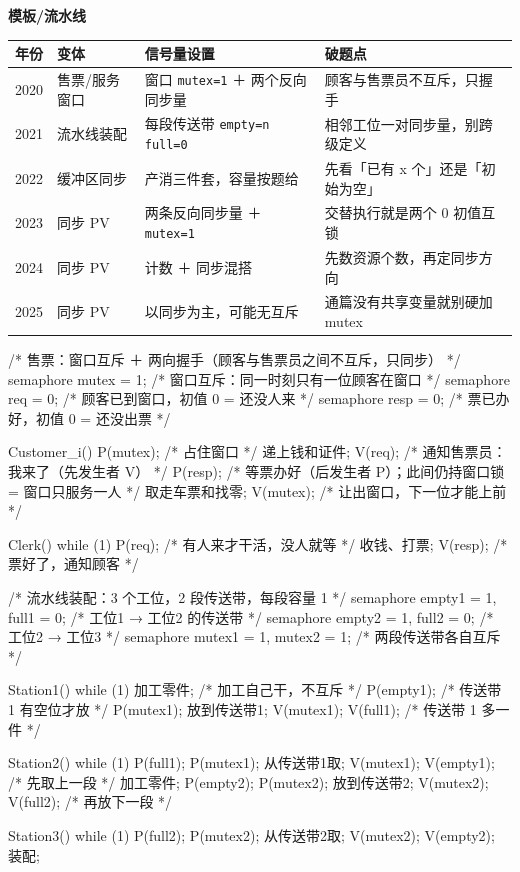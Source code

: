 \documentclass[10pt,a4paper]{ctexart}
\begin{document}
\textbf{模板/流水线}

\begin{center}\small
\begin{tabularx}{\linewidth}{@{}cl>{\raggedright\arraybackslash}X>{\raggedright\arraybackslash}X@{}}
\toprule
年份 & 变体 & 信号量设置 & 破题点 \\
\midrule
2020 & 售票/服务窗口 & 窗口 \texttt{mutex=1} ＋ 两个反向同步量 & 顾客与售票员不互斥，只握手 \\
2021 & 流水线装配 & 每段传送带 \texttt{empty=n} \texttt{full=0} & 相邻工位一对同步量，别跨级定义 \\
2022 & 缓冲区同步 & 产消三件套，容量按题给 & 先看「已有 x 个」还是「初始为空」 \\
2023 & 同步 PV & 两条反向同步量 ＋ \texttt{mutex=1} & 交替执行就是两个 0 初值互锁 \\
2024 & 同步 PV & 计数 ＋ 同步混搭 & 先数资源个数，再定同步方向 \\
2025 & 同步 PV & 以同步为主，可能无互斥 & 通篇没有共享变量就别硬加 mutex \\
\bottomrule
\end{tabularx}
\end{center}

\begin{codebox}
/* 售票：窗口互斥 ＋ 两向握手（顾客与售票员之间不互斥，只同步） */
semaphore mutex = 1;      /* 窗口互斥：同一时刻只有一位顾客在窗口 */
semaphore req   = 0;      /* 顾客已到窗口，初值 0 = 还没人来 */
semaphore resp  = 0;      /* 票已办好，初值 0 = 还没出票 */

Customer_i() {
    P(mutex);                       /* 占住窗口 */
    递上钱和证件;
    V(req);                         /* 通知售票员：我来了（先发生者 V） */
    P(resp);                        /* 等票办好（后发生者 P）；此间仍持窗口锁 = 窗口只服务一人 */
    取走车票和找零;
    V(mutex);                       /* 让出窗口，下一位才能上前 */
}

Clerk() { while (1) {
    P(req);                         /* 有人来才干活，没人就等 */
    收钱、打票;
    V(resp);                        /* 票好了，通知顾客 */
} }
\end{codebox}

\begin{codebox}
/* 流水线装配：3 个工位，2 段传送带，每段容量 1 */
semaphore empty1 = 1, full1 = 0;    /* 工位1 → 工位2 的传送带 */
semaphore empty2 = 1, full2 = 0;    /* 工位2 → 工位3 */
semaphore mutex1 = 1, mutex2 = 1;   /* 两段传送带各自互斥 */

Station1() { while (1) {
    加工零件;                        /* 加工自己干，不互斥 */
    P(empty1);                       /* 传送带 1 有空位才放 */
    P(mutex1); 放到传送带1; V(mutex1);
    V(full1);                        /* 传送带 1 多一件 */
} }

Station2() { while (1) {
    P(full1); P(mutex1); 从传送带1取; V(mutex1); V(empty1);   /* 先取上一段 */
    加工零件;
    P(empty2); P(mutex2); 放到传送带2; V(mutex2); V(full2);   /* 再放下一段 */
} }

Station3() { while (1) {
    P(full2); P(mutex2); 从传送带2取; V(mutex2); V(empty2);
    装配;
} }
\end{codebox}
\end{document}
